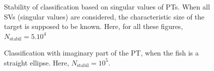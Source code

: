 \begin{figure}
\caption{Stability of
classification based on singular values of
PTs. When all SVs (singular values) are considered, 
the characteristic size of the target is supposed to be known.
Here, for all these figures, $N_{\textrm{stabil}}=5.10^4$}
\end{figure}


% 


\begin{figure}[t]
\centering
{}
\caption{Classification with imaginary part of the PT, when the fish is a straight
ellipse. Here, $N_{\textrm{stabil}}=10^5$.}
\end{figure}


